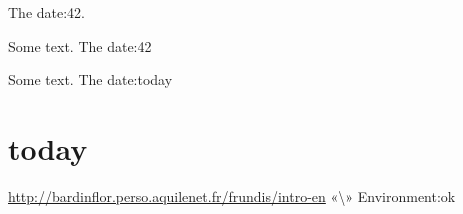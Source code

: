The date:42.


Some text. The date:42

Some text. The date:today

\chapter{today}
\label{s:1}
\url{http://bardinflor.perso.aquilenet.fr/frundis/intro-en}
«\textbackslash{}»
Environment:ok

